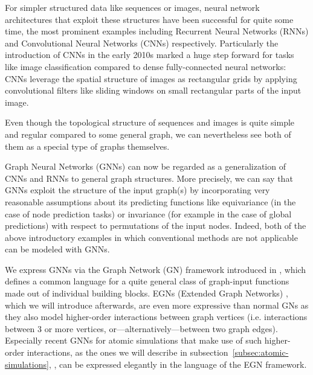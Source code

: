 For simpler structured data like sequences or images, neural
network architectures that exploit these structures have been successful for quite some time, the 
most prominent examples including Recurrent Neural Networks (RNNs) and
Convolutional Neural Networks (CNNs) respectively. Particularly the introduction of CNNs 
in the early 2010s marked a huge step forward for tasks like image classification 
compared to dense fully-connected neural networks: CNNs leverage the spatial structure of
images as rectangular grids by applying convolutional filters like sliding windows on small
rectangular parts of the input image. 

Even though the topological structure of sequences and images is quite simple and regular
compared to some general graph, we can nevertheless see both of them as a special type of graphs themselves. 



Graph Neural 
Networks (GNNs) can now be regarded as a generalization of CNNs and RNNs to general graph structures.
More precisely, we can say that GNNs exploit the structure of the input graph(s) by incorporating very
reasonable assumptions about its predicting functions like equivariance (in the case of node prediction 
tasks) or invariance (for example in the case of global predictions) with respect to permutations of the 
input nodes. Indeed, both of the above introductory examples in which conventional methods are not applicable
can be modeled with GNNs.

We express GNNs via the Graph Network (GN) framework introduced in 
\cite{https://doi.org/10.48550/arxiv.1806.01261}, which defines
a common language for a quite general class of graph-input functions made out of 
individual building blocks. EGNs (Extended Graph Networks) \cite{https://doi.org/10.48550/arxiv.2203.09697}, which we will 
introduce afterwards, are even more expressive than normal 
GNs as they also model higher-order interactions between graph vertices (i.e. interactions 
between 3 or more vertices, or---alternatively---between two graph edges). Especially recent 
GNNs for atomic simulations that make use of such higher-order interactions, as the ones we will describe 
in subsection~\ref{subsec:atomic-simulations}, \cite*{DBLP:journals/corr/abs-2003-03123,https://doi.org/10.48550/arxiv.2106.08903}, 
can be expressed elegantly in the language of the EGN framework.


